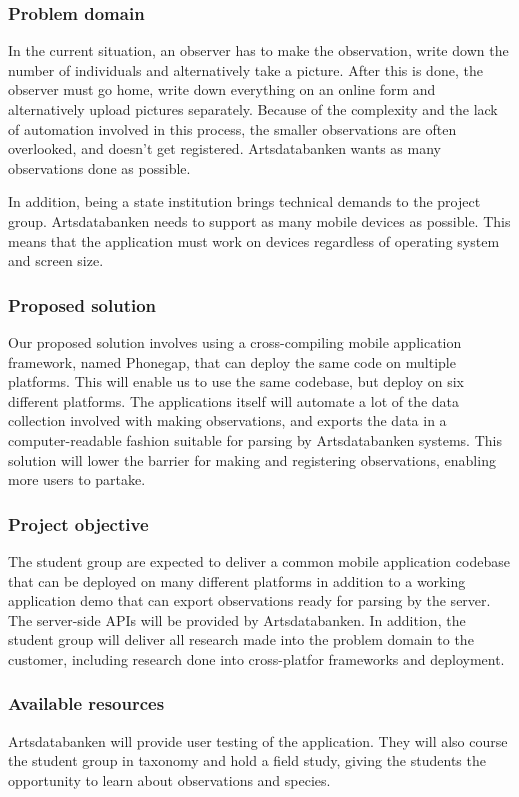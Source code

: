 \subsubsection{Problem domain}
In the current situation, an observer has to make the observation, write down the number of individuals and alternatively take a picture. After this is done, the observer must go home, write down everything on an online form and alternatively upload pictures separately. Because of the complexity and the lack of automation involved in this process, the smaller observations are often overlooked, and doesn't get registered. Artsdatabanken wants as many observations done as possible.

In addition, being a state institution brings technical demands to the project group. Artsdatabanken needs to support as many mobile devices as possible. This means that the application must work on devices regardless of operating system and screen size.

\subsubsection{Proposed solution}
Our proposed solution involves using a cross-compiling mobile application framework, named Phonegap, that can deploy the same code on multiple platforms. This will enable us to use the same codebase, but deploy on six different platforms. The applications itself will automate a lot of the data collection involved with making observations, and exports the data in a computer-readable fashion suitable for parsing by Artsdatabanken systems. This solution will lower the barrier for making and registering observations, enabling more users to partake.

\subsubsection{Project objective}
The student group are expected to deliver a common mobile application codebase that can be deployed on many different platforms in addition to a working application demo that can export observations ready for parsing by the server. The server-side APIs will be provided by Artsdatabanken. In addition, the student group will deliver all research made into the problem domain to the customer, including research done into cross-platfor frameworks and deployment.

\subsubsection{Available resources}
Artsdatabanken will provide user testing of the application. They will also course the student group in taxonomy and hold a field study, giving the students the opportunity to learn about observations and species.


